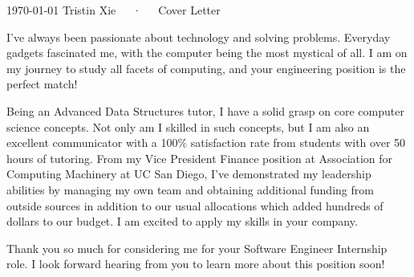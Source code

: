 \documentclass[11pt, letterpaper]{awesome-cv}
\begin{document}
\makecvheader[R]

\makecvfooter
  {\today}
  {Tristin Xie~~~·~~~Cover Letter}
  {}

\makelettertitle

\begin{cvletter}

I've always been passionate about technology and solving problems. Everyday gadgets
fascinated me, with the computer being the most mystical of all. I am on my journey to study
all facets of computing, and your engineering position is the perfect match!

Being an Advanced Data Structures tutor, I have a solid grasp on core computer science concepts. 
Not only am I skilled in such concepts, but I am also an excellent communicator with a
100\% satisfaction rate from students with over 50 hours of tutoring. From my Vice President Finance
position at Association for Computing Machinery at UC San Diego, I've demonstrated my leadership
abilities by managing my own team and obtaining additional funding from outside sources in addition
to our usual allocations which added hundreds of dollars to our budget. I am excited to apply my skills
in your company.

Thank you so much for considering me for your Software Engineer Internship role. I look forward hearing 
from you to learn more about this position soon!

\end{cvletter}


\makeletterclosing
\end{document}
